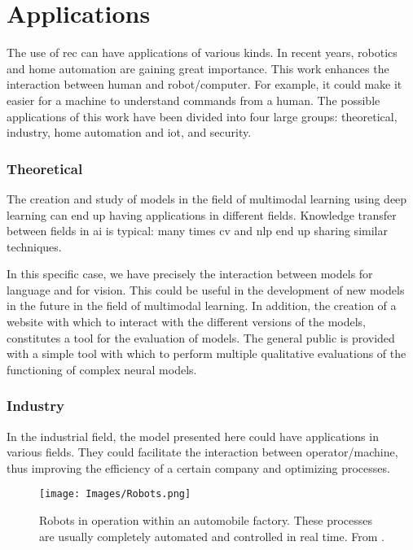 \section{Applications}\label{sec:applications}

The use of \gls{rec} can have applications of various kinds. In recent years,
robotics and home automation are gaining great importance. This work enhances
the interaction between human and robot/computer. For example, it could make it
easier for a machine to understand commands from a human. The possible
applications of this work have been divided into four large groups:
theoretical, industry, home automation and \acs{iot}, and security.

\subsubsection{Theoretical}

The creation and study of models in the field of multimodal
learning using deep learning can end up having
applications in different fields. Knowledge transfer between fields in \gls{ai}
is typical: many times \gls{cv} and \gls{nlp} end up sharing similar
techniques.

In this specific case, we have precisely the interaction between models for
language and for vision. This could be useful in the development of new models
in the future in the field of multimodal
learning. In addition, the creation of a website
with which to interact with the different versions of the models, constitutes a
tool for the evaluation of models. The general public is provided with a simple
tool with which to perform multiple qualitative evaluations of the functioning
of complex neural models.

\subsubsection{Industry}

In the industrial field, the model presented here could have applications in
various fields. They could facilitate the interaction between operator/machine,
thus improving the efficiency of a certain company and optimizing processes.

\begin{figure}[ht]
  \centering
  \texttt{[image: Images/Robots.png]}
  \caption[Robots in automobile factory]{Robots in operation within an
    automobile factory. These processes are usually completely automated and
    controlled in real time. From
    .}\label{fig:robots}
\end{figure}

